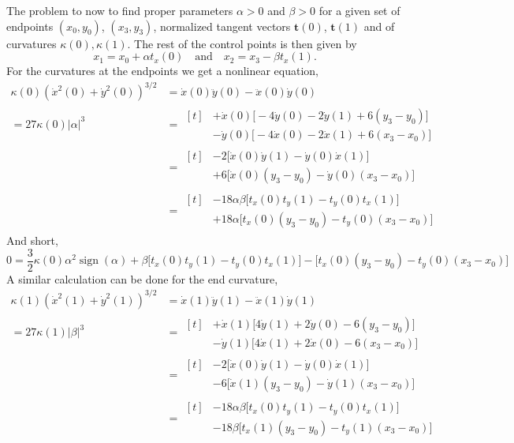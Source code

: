 \documentclass{article}
\newcommand{\sign}{\operatorname{sign}}
\begin{document}
The problem to now to find proper parameters $\alpha>0$ and $\beta>0$ for a given set of
endpoints $(x_0,y_0)$, $(x_3, y_3)$,
normalized tangent vectors $\mathbf{t}(0)$, $\mathbf{t}(1)$ and of
curvatures $\kappa(0), \kappa(1)$.
The rest of the control points is then given by
%
\begin{equation}
  x_1 = x_0 + \alpha t_x(0) \quad\text{and}\quad
  x_2 = x_3 - \beta  t_x(1).
\end{equation}
%
For the curvatures at the endpoints we get a nonlinear equation,
%
\begin{align}
  \kappa(0) (\dot x^2(0) + \dot y^2(0))^{3/2}
  &= \dot x(0) \ddot y(0) - \ddot x(0) \dot y(0) \\
  = 27 \kappa(0) |\alpha|^3
  &= \begin{aligned}[t]
      &+\dot x(0) \bigl[- 4\dot y(0) - 2\dot y(1) + 6(y_3-y_0)\bigr] \\
      &-\dot y(0) \bigl[- 4\dot x(0) - 2\dot x(1) + 6(x_3-x_0)\bigr]
     \end{aligned}\\
  &= \begin{aligned}[t]
      &-2 \bigl[\dot x(0) \dot y(1) - \dot y(0)\dot x(1)\bigr] \\
      &+6 \bigl[\dot x(0) (y_3-y_0) - \dot y(0) (x_3-x_0)\bigr]
     \end{aligned}\\
  &= \begin{aligned}[t]
      &-18 \alpha\beta \bigl[t_x(0)t_y(1) - t_y(0)t_x(1)\bigr] \\
      &+18 \alpha \bigl[t_x(0) (y_3-y_0) - t_y(0) (x_3-x_0)\bigr]
     \end{aligned}
\end{align}
%
And short,
%
\begin{equation}
  0 = \frac{3}{2}\kappa(0) \alpha^2 \sign(\alpha)
    + \beta \bigl[t_x(0)t_y(1) - t_y(0)t_x(1)\bigr]
    - \bigl[t_x(0) (y_3-y_0) - t_y(0) (x_3-x_0)\bigr]
\end{equation}
%
A similar calculation can be done for the end curvature,
%
\begin{align}
  \kappa(1) (\dot x^2(1) + \dot y^2(1))^{3/2}
  &= \dot x(1) \ddot y(1) - \ddot x(1) \dot y(1) \\
  = 27 \kappa(1) |\beta|^3
  &= \begin{aligned}[t]
       &+\dot x(1) \bigl[ 4\dot y(1) + 2\dot y(0) - 6(y_3-y_0)\bigr] \\
       &-\dot y(1) \bigl[ 4\dot x(1) + 2\dot x(0) - 6(x_3-x_0)\bigr]
     \end{aligned}\\
  &= \begin{aligned}[t]
       &-2 \bigl[\dot x(0) \dot y(1) - \dot y(0)\dot x(1)\bigr] \\
       &-6 \bigl[\dot x(1) (y_3-y_0) - \dot y(1) (x_3-x_0)\bigr]
     \end{aligned}\\
  &= \begin{aligned}[t]
       &-18 \alpha\beta \bigl[t_x(0)t_y(1) - t_y(0)t_x(1)\bigr] \\
       &-18 \beta \bigl[t_x(1) (y_3-y_0) - t_y(1) (x_3-x_0)\bigr]
     \end{aligned}
\end{align}
\end{document}
